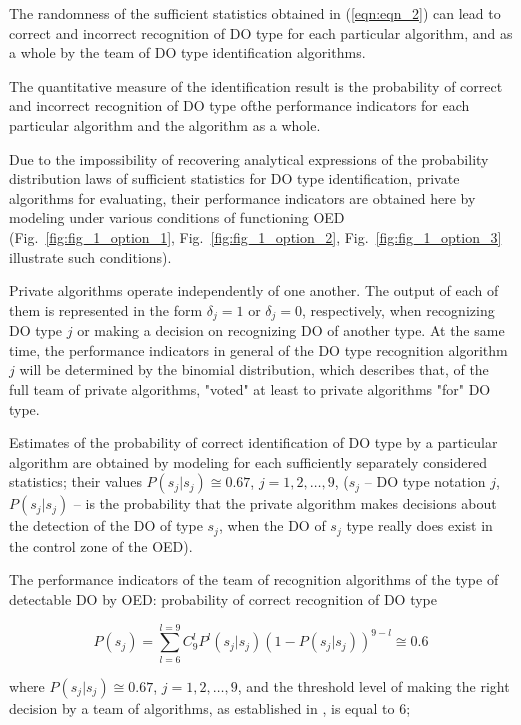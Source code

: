The randomness of the sufficient statistics obtained in (\ref{eqn:eqn_2}) can lead to correct and incorrect recognition of DO type for each particular algorithm, and as a whole by the team of DO type identification algorithms.

The quantitative measure of the identification result is the probability of correct and incorrect recognition of DO type ofthe performance indicators for each particular algorithm and the algorithm as a whole.

Due to the impossibility of recovering analytical expressions of the probability distribution laws of sufficient statistics for DO type identification, private algorithms for evaluating, their performance indicators are obtained here by modeling under various conditions of functioning OED (Fig.~\ref{fig:fig_1_option_1}, Fig.~\ref{fig:fig_1_option_2}, Fig.~\ref{fig:fig_1_option_3} illustrate such conditions).

Private algorithms operate independently of one another.
The output of each of them is represented in the form $\delta_j = 1$ or $\delta_j = 0$, respectively, when recognizing DO type $j$ or making a decision on recognizing DO of another type.
At the same time, the performance indicators in general of the DO type recognition algorithm $j$ will be determined by the binomial distribution, which describes that, of the full team of private algorithms, "voted" at least to private algorithms "for" DO type.

Estimates of the probability of correct identification of DO type by a particular algorithm are obtained by modeling for each sufficiently separately considered statistics; their values $P(s_j | s_j) \cong 0.67$, $j = 1, 2, \dots, 9$, ($s_j$ -- DO type notation $j$, $P(s_j | s_j)$ -- is the probability that the private algorithm makes decisions about the detection of the DO of type $s_j$, when the DO of $s_j$ type really does exist in the control zone of the OED).

The performance indicators of the team of recognition algorithms of the type of detectable DO by OED: probability of correct recognition of DO type 

\begin{equation}
P(s_j) = \sum_{l = 6}^{l = 9}{C_{9}^{l}P^l(s_j | s_j)(1 - P(s_j | s_j))^{9 - l}} \cong 0.6
\end{equation}

where $P(s_j | s_j) \cong 0.67$, $j = 1, 2, \dots, 9$, and the threshold level of making the right decision by a team of algorithms, as established in \cite{bib_01}, is equal to $6$; 

